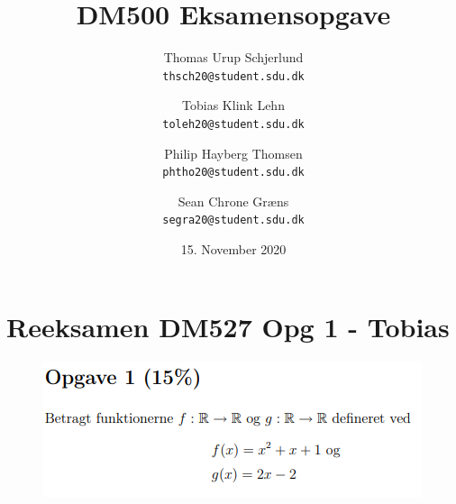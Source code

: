 \documentclass{article}
\title{DM500 Eksamensopgave}
\author{
	Thomas Urup Schjerlund\\
	\texttt{thsch20@student.sdu.dk}
	\and
	Tobias Klink Lehn\\
	\texttt{toleh20@student.sdu.dk}
	\and
	Philip Hayberg Thomsen\\
	\texttt{phtho20@student.sdu.dk}
	\and
	Sean Chrone Græns\\
	\texttt{segra20@student.sdu.dk}
}
\date{15. November 2020}
\begin{document}
\begin{titlepage}
\maketitle
\end{titlepage}

\section{Reeksamen DM527 Opg 1 - Tobias}
\begin{figure}[h]
\includegraphics[scale=1]{Opgave1Formulering}
\end{figure}
\end{document}
